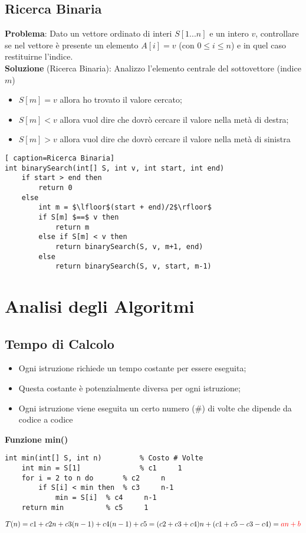 \documentclass[../cheatSheetAlgoritmi.tex]{subfiles}
\begin{document}
\subsection{Ricerca Binaria}
\textbf{Problema}: Dato un vettore ordinato di interi $S[1...n]$ e un intero $v$, controllare se nel vettore è presente un elemento $A[i] = v$ (con $0 \leq i \leq n$) e in quel caso restituirne l'indice.\\
\textbf{Soluzione} (Ricerca Binaria): Analizzo l'elemento centrale del sottovettore (indice $m$)
\begin{itemize}
	\item $S[m]=v$ allora ho trovato il valore cercato;
	\item $S[m]<v$ allora vuol dire che dovrò cercare il valore nella metà di destra;
	\item $S[m]>v$ allora vuol dire che dovrò cercare il valore nella metà di sinistra
\end{itemize}
\begin{lstlisting}[ caption=Ricerca Binaria]
int binarySearch(int[] S, int v, int start, int end)
	if start > end then
		return 0
	else
		int m = $\lfloor$(start + end)/2$\rfloor$
		if S[m] $==$ v then
			return m
		else if S[m] < v then
			return binarySearch(S, v, m+1, end)
		else
			return binarySearch(S, v, start, m-1)
\end{lstlisting}

\section{Analisi degli Algoritmi}
\subsection{Tempo di Calcolo}
\begin{itemize}
	\item Ogni istruzione richiede un tempo costante per essere eseguita;
	\item Questa costante è potenzialmente diversa per ogni istruzione;
	\item Ogni istruzione viene eseguita un certo numero (\#) di volte che dipende da codice a codice
\end{itemize}
\textbf{Funzione min()}
\begin{lstlisting}[caption=Ricerca Minimo + calcolo del costo]
int min(int[] S, int n)			% Costo # Volte
	int min = S[1]	    		% c1   	 1
	for i = 2 to n do		% c2     n
		if S[i] < min then 	% c3 	 n-1
			min = S[i]	% c4 	 n-1
	return min			% c5	 1
\end{lstlisting}
$T(n) = c1 + c2n + c3(n-1) + c4(n-1) + c5 = (c2 + c3 + c4)n + (c1 + c5 - c3 - c4) = \textcolor{red}{an + b}$
\end{document}

